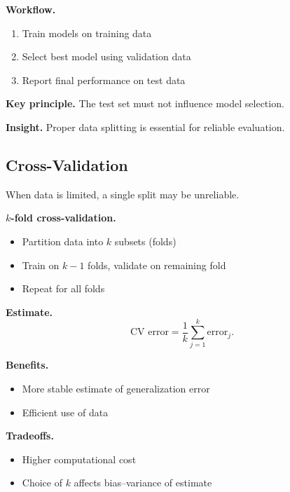\medskip

\noindent
\textbf{Workflow.}
\begin{enumerate}
    \item Train models on training data
    \item Select best model using validation data
    \item Report final performance on test data
\end{enumerate}

\medskip

\noindent
\textbf{Key principle.}  
The test set must not influence model selection.

\medskip

\noindent
\textbf{Insight.}  
Proper data splitting is essential for reliable evaluation.

\subsection{Cross-Validation}

When data is limited, a single split may be unreliable.

\medskip

\noindent
\textbf{$k$-fold cross-validation.}
\begin{itemize}
    \item Partition data into $k$ subsets (folds)
    \item Train on $k-1$ folds, validate on remaining fold
    \item Repeat for all folds
\end{itemize}

\medskip

\noindent
\textbf{Estimate.}
\[
\text{CV error} = \frac{1}{k} \sum_{j=1}^k \text{error}_j.
\]

\medskip

\noindent
\textbf{Benefits.}
\begin{itemize}
    \item More stable estimate of generalization error
    \item Efficient use of data
\end{itemize}

\medskip

\noindent
\textbf{Tradeoffs.}
\begin{itemize}
    \item Higher computational cost
    \item Choice of $k$ affects bias–variance of estimate
\end{itemize}

